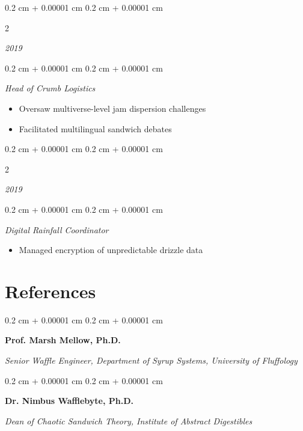 \documentclass[10pt, letterpaper]{article}
\newenvironment{highlights}{
    \begin{itemize}[
        topsep=0.10 cm,
        parsep=0.10 cm,
        partopsep=0pt,
        itemsep=0pt,
        leftmargin=0.4 cm + 10pt
    ]
}{
    \end{itemize}
}
\newenvironment{onecolentry}{
    \begin{adjustwidth}{
        0.2 cm + 0.00001 cm
    }{
        0.2 cm + 0.00001 cm
    }
}{
    \end{adjustwidth}
}
\newenvironment{twocolentry}[2][]{
    \onecolentry
    \def\secondColumn{#2}
    \setcolumnwidth{\fill, 4.5 cm}
    \begin{paracol}{2}
}{
    \switchcolumn \raggedleft \secondColumn
    \end{paracol}
    \endonecolentry
}
\begin{document}
    \vspace{0.2 cm}
    
    \begin{twocolentry}{
        \textit{2019}}
    \end{twocolentry}
    
    \begin{onecolentry}
        \textit{Head of Crumb Logistics}
        \begin{highlights}
            \item Oversaw multiverse-level jam dispersion challenges
            \item Facilitated multilingual sandwich debates
        \end{highlights}
    \end{onecolentry}
    
    \vspace{0.2 cm}
    
    \begin{twocolentry}{
        \textit{2019}}
    \end{twocolentry}
    
    \begin{onecolentry}
        \textit{Digital Rainfall Coordinator}
        \begin{highlights}
            \item Managed encryption of unpredictable drizzle data
        \end{highlights}
    \end{onecolentry}
    
    \vspace{0.05 cm}
    
    \section{References}
    
    \begin{onecolentry}
        \textbf{Prof. Marsh Mellow, Ph.D.}
    
        \textit{Senior Waffle Engineer, Department of Syrup Systems, University of Fluffology}
    
    \end{onecolentry}
    
    \vspace{0.2 cm}
    
    \begin{onecolentry}
        \textbf{Dr. Nimbus Wafflebyte, Ph.D.}
    
        \textit{Dean of Chaotic Sandwich Theory, Institute of Abstract Digestibles}
    
    \end{onecolentry}
    
    \vspace{0.2 cm}
    
    \vspace{0.05 cm}
    
    
\end{document}
